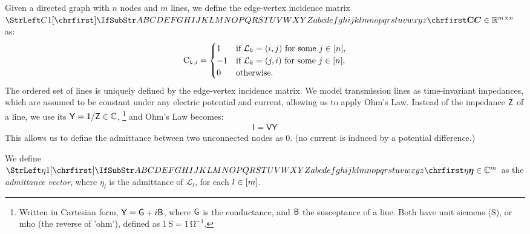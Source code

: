 \documentclass[main.tex]{subfiles}
\begin{document}
Given a directed graph with $n$ nodes and $m$ lines, we define the edge-vertex incidence matrix $\mat{C} \in \mathbb{R}^{m \times n}$ as:
\begin{align*}
    {\mathrm{C}}_{k,i} = 
    \begin{cases}
         1 & \text{if } \mathcal{L}_k=(i,j) \text{ for some } j \in [n], \\
        -1 & \text{if } \mathcal{L}_k=(j,i) \text{ for some } j \in [n], \\
         0 & \text{otherwise}.
    \end{cases}
\end{align*}
The ordered set of lines is uniquely defined by the edge-vertex incidence matrix. 
We model transmission lines as time-invariant impedances, which are assumed to be constant under any electric potential and current, allowing us to apply Ohm's Law. Instead of the impedance $\mathsf{Z}$ of a line, we use its  $\mathsf{Y=1/Z} \in \mathbb{C}$,
\footnote{Written in Cartesian form, $\mathsf{Y=G}+i\mathsf{B}$, where $\mathsf{G}$ is the conductance, and $\mathsf{B}$ the susceptance of a line. Both have unit siemens (S), or mho (the reverse of 'ohm'), defined as $1 \,\si{\siemens}=1\,\si{\ohm}^{-1}$. }
 and Ohm's Law becomes:
\begin{align*}
    \mathsf{I=VY}
\end{align*}
This allows us to define the admittance between two unconnected nodes as $0$. (\ie no current is induced by a potential difference.)  

We define $\mat{\eta} \in \mathbb{C}^m$ as the \emph{admittance vector}, where $\eta_l$ is the admittance of $\mathcal{L}_l$, for each $l \in [m]$. 
\end{document}
